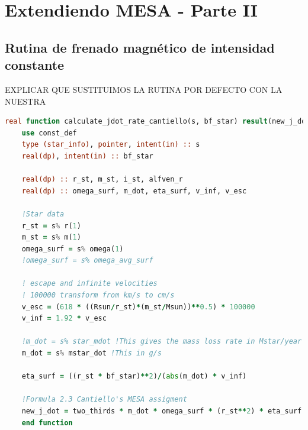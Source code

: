 \section{Extendiendo MESA - Parte II}

\subsection{Rutina de frenado magnético de intensidad constante}
EXPLICAR QUE SUSTITUIMOS LA RUTINA POR DEFECTO CON LA NUESTRA
\begin{lstlisting}[language=Fortran, caption={Rutina de par de torsión.}, label={lst:jdot_cantiello}]
	real function calculate_jdot_rate_cantiello(s, bf_star) result(new_j_dot)
	use const_def
	type (star_info), pointer, intent(in) :: s
	real(dp), intent(in) :: bf_star
	
	real(dp) :: r_st, m_st, i_st, alfven_r
	real(dp) :: omega_surf, m_dot, eta_surf, v_inf, v_esc
	
	!Star data
	r_st = s% r(1)
	m_st = s% m(1)
	omega_surf = s% omega(1)
	!omega_surf = s% omega_avg_surf
	
	! escape and infinite velocities
	! 100000 transform from km/s to cm/s
	v_esc = (618 * ((Rsun/r_st)*(m_st/Msun))**0.5) * 100000
	v_inf = 1.92 * v_esc
	
	!m_dot = s% star_mdot !This gives the mass loss rate in Mstar/year
	m_dot = s% mstar_dot !This in g/s
	
	eta_surf = ((r_st * bf_star)**2)/(abs(m_dot) * v_inf)
	
	!Formula 2.3 Cantiello's MESA assigment
	new_j_dot = two_thirds * m_dot * omega_surf * (r_st**2) * eta_surf
	end function
\end{lstlisting}


